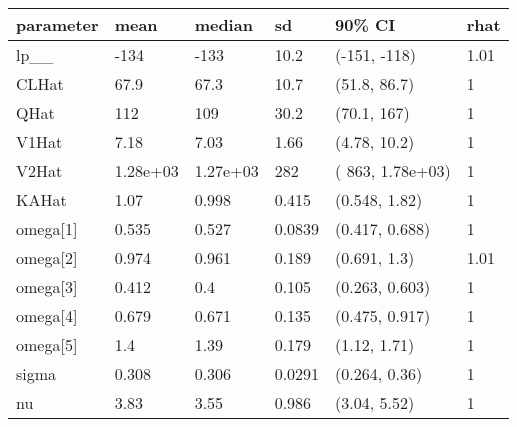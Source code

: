 
\begin{tabular}{l|l|l|l|l|l}
\hline
parameter & mean & median & sd & 90\% CI & rhat\\
\hline
lp\_\_ & -134 & -133 & 10.2 & (-151, -118) & 1.01\\
\hline
CLHat & 67.9 & 67.3 & 10.7 & (51.8, 86.7) & 1\\
\hline
QHat & 112 & 109 & 30.2 & (70.1,  167) & 1\\
\hline
V1Hat & 7.18 & 7.03 & 1.66 & (4.78, 10.2) & 1\\
\hline
V2Hat & 1.28e+03 & 1.27e+03 & 282 & ( 863, 1.78e+03) & 1\\
\hline
KAHat & 1.07 & 0.998 & 0.415 & (0.548, 1.82) & 1\\
\hline
omega[1] & 0.535 & 0.527 & 0.0839 & (0.417, 0.688) & 1\\
\hline
omega[2] & 0.974 & 0.961 & 0.189 & (0.691,  1.3) & 1.01\\
\hline
omega[3] & 0.412 & 0.4 & 0.105 & (0.263, 0.603) & 1\\
\hline
omega[4] & 0.679 & 0.671 & 0.135 & (0.475, 0.917) & 1\\
\hline
omega[5] & 1.4 & 1.39 & 0.179 & (1.12, 1.71) & 1\\
\hline
sigma & 0.308 & 0.306 & 0.0291 & (0.264, 0.36) & 1\\
\hline
nu & 3.83 & 3.55 & 0.986 & (3.04, 5.52) & 1\\
\hline
\end{tabular}
